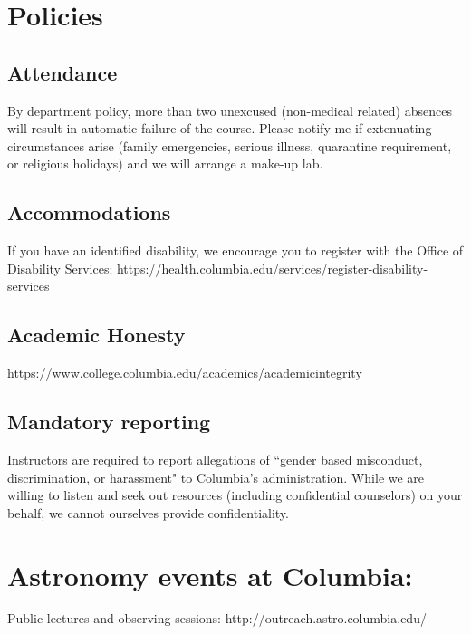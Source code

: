 \documentclass[11pt]{article}
\begin{document}
\section*{Policies}
 
\subsection*{Attendance}
 
By department policy, more than two unexcused (non-medical related) absences will result in automatic failure of the course. Please notify me if  extenuating circumstances arise (family emergencies, serious illness, quarantine requirement, or religious holidays) and we will arrange a make-up lab.
 
\subsection*{Accommodations}
If you have an identified disability, we encourage you to register with the Office of Disability Services: https://health.columbia.edu/services/register-disability-services
 
\subsection*{Academic Honesty}
https://www.college.columbia.edu/academics/academicintegrity
 
\subsection*{Mandatory reporting}
Instructors are required to report allegations of ``gender based misconduct, discrimination, or harassment" to Columbia's administration. While we are willing to listen and seek out resources (including confidential counselors) on your behalf, we cannot ourselves provide confidentiality.

\section*{Astronomy events at Columbia:}
Public lectures and observing sessions: http://outreach.astro.columbia.edu/
\end{document}
